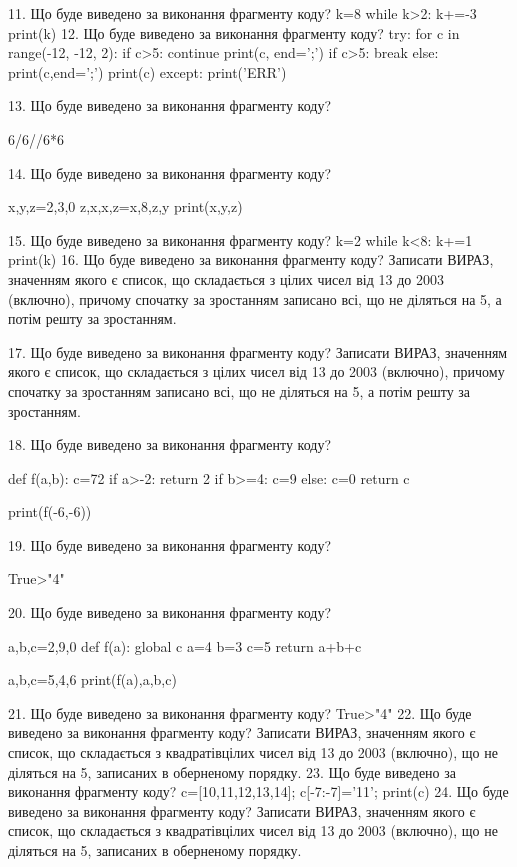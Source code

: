 \documentclass[11pt]{article}
\begin{document}
11. Що буде виведено за виконання фрагменту коду?
k=8
   while k>2: k+=-3
   print(k)
12. Що буде виведено за виконання фрагменту коду?
try:
    for c in range(-12, -12, 2):
        if c>5:
            continue
        print(c, end=';')
        if c>5:
            break
    else:
        print(c,end=';')
    print(c)
except:
    print('ERR')

13. Що буде виведено за виконання фрагменту коду?

6/6//6*6

14. Що буде виведено за виконання фрагменту коду?

x,y,z=2,3,0
z,x,x,z=x,8,z,y
print(x,y,z)

15. Що буде виведено за виконання фрагменту коду?
k=2
   while k<8: k+=1
   print(k)
16. Що буде виведено за виконання фрагменту коду?
Записати ВИРАЗ, значенням якого є список, що складається з цілих чисел від 13 до 2003 (включно), причому спочатку за зростанням записано всі, що не діляться на 5, а потім решту за зростанням.

17. Що буде виведено за виконання фрагменту коду?
Записати ВИРАЗ, значенням якого є список, що складається з цілих чисел від 13 до 2003 (включно), причому спочатку за зростанням записано всі, що не діляться на 5, а потім решту за зростанням.

18. Що буде виведено за виконання фрагменту коду?

def f(a,b):
    c=72
    if a>-2:
        return 2
    if b>=4:
         c=9
    else: 
        c=0
    return c

print(f(-6,-6))

19. Що буде виведено за виконання фрагменту коду?

True>"4"

20. Що буде виведено за виконання фрагменту коду?

a,b,c=2,9,0
def f(a):
global c    a=4
    b=3
    c=5
    return a+b+c

a,b,c=5,4,6
print(f(a),a,b,c)

21. Що буде виведено за виконання фрагменту коду?
True>"4"
22. Що буде виведено за виконання фрагменту коду?
Записати ВИРАЗ, значенням якого є список, що складається з квадратівцілих чисел від 13 до 2003 (включно), що не діляться на 5, записаних в оберненому порядку.
23. Що буде виведено за виконання фрагменту коду?
c=[10,11,12,13,14]; c[-7:-7]='11'; print(c)
24. Що буде виведено за виконання фрагменту коду?
Записати ВИРАЗ, значенням якого є список, що складається з квадратівцілих чисел від 13 до 2003 (включно), що не діляться на 5, записаних в обернено\-му порядку.
\end{document}
